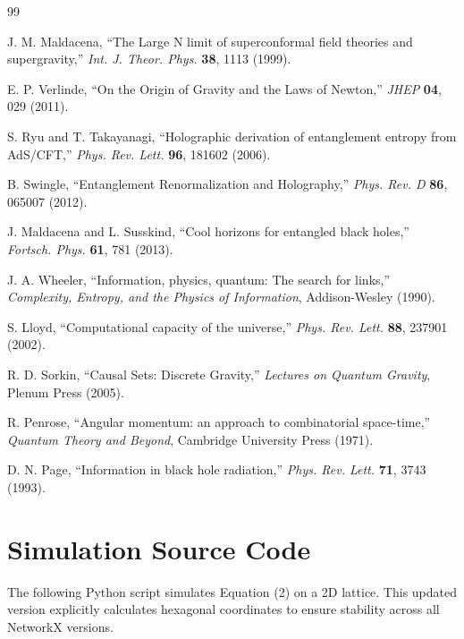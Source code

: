 \documentclass[11pt, a4paper]{article}
\begin{document}
\begin{thebibliography}{99}

J. M. Maldacena, ``The Large N limit of superconformal field theories and supergravity,'' \textit{Int. J. Theor. Phys.} \textbf{38}, 1113 (1999).

E. P. Verlinde, ``On the Origin of Gravity and the Laws of Newton,'' \textit{JHEP} \textbf{04}, 029 (2011).

S. Ryu and T. Takayanagi, ``Holographic derivation of entanglement entropy from AdS/CFT,'' \textit{Phys. Rev. Lett.} \textbf{96}, 181602 (2006).

B. Swingle, ``Entanglement Renormalization and Holography,'' \textit{Phys. Rev. D} \textbf{86}, 065007 (2012).

J. Maldacena and L. Susskind, ``Cool horizons for entangled black holes,'' \textit{Fortsch. Phys.} \textbf{61}, 781 (2013).

J. A. Wheeler, ``Information, physics, quantum: The search for links,'' \textit{Complexity, Entropy, and the Physics of Information}, Addison-Wesley (1990).

S. Lloyd, ``Computational capacity of the universe,'' \textit{Phys. Rev. Lett.} \textbf{88}, 237901 (2002).

R. D. Sorkin, ``Causal Sets: Discrete Gravity,'' \textit{Lectures on Quantum Gravity}, Plenum Press (2005).

R. Penrose, ``Angular momentum: an approach to combinatorial space-time,'' \textit{Quantum Theory and Beyond}, Cambridge University Press (1971).

D. N. Page, ``Information in black hole radiation,'' \textit{Phys. Rev. Lett.} \textbf{71}, 3743 (1993).

\end{thebibliography}

\newpage

\appendix
\section{Simulation Source Code}
The following Python script simulates Equation (2) on a 2D lattice. This updated version explicitly calculates hexagonal coordinates to ensure stability across all NetworkX versions.
\end{document}
